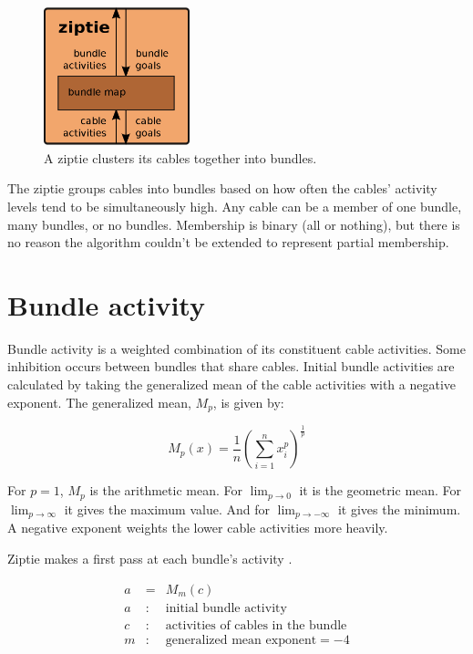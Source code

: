 \documentclass[oneside,twocolumn]{article}
\begin{document}
\begin{figure}[ht]
\centering
\includegraphics[height=4.0cm]{figs/ziptie.png}
\caption{A ziptie clusters its cables together into bundles.}
\label{ziptie}
\end{figure}

The ziptie groups cables into bundles based on how often the cables' activity levels tend to be simultaneously high. Any cable can be a member of one bundle, many bundles, or no bundles. Membership is binary (all or nothing), but there is no reason the algorithm couldn't be extended to represent partial membership.

\section*{\color{copper} Bundle activity}

Bundle activity is a weighted combination of its constituent cable activities. Some inhibition occurs between bundles that share cables. Initial bundle activities are calculated by taking the generalized mean of the cable activities with a negative exponent.  
The generalized mean, $M_p$, is given by:

\begin{equation*}
M_p(x) = {\frac{1}{n}\left( \sum_{i=1}^{n}x_i^p  \right)}^{\frac{1}{p}} 
\end{equation*}

For $p = 1$, $M_p$ is the arithmetic mean. For $\lim_{p \to 0}$ it is the geometric mean. For $\lim_{p \to \infty}$ it gives the maximum value. And for   $\lim_{p \to -\infty}$ it gives the minimum. A negative exponent weights the lower cable activities more heavily. 

Ziptie makes a first pass at each bundle's activity .

\begin{eqnarray*}
a &=& M_m(c)\\ 
a &:& \mbox{initial bundle activity}\\ 
c &:& \mbox{activities of cables in the bundle}\\
m &:& \mbox{generalized mean exponent} = -4
\end{eqnarray*}
\end{document}

